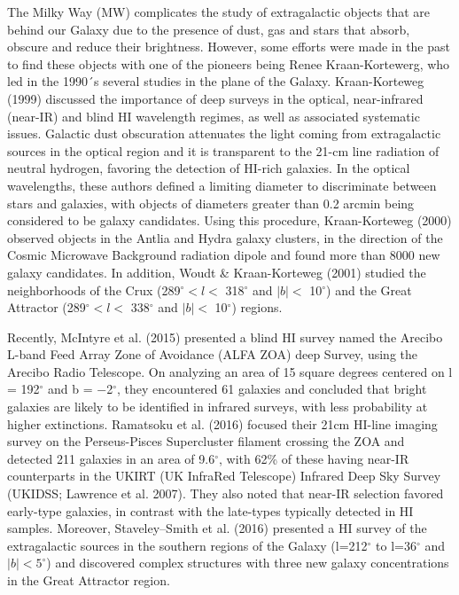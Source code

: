 \documentclass[preprint2]{aastex}
\begin{document}
The  Milky Way (MW) complicates the study of extragalactic 
objects that are 
behind our Galaxy due to the presence of dust, gas and stars that absorb,
obscure and 
reduce their brightness.
However, some efforts were made in the past to find these objects with
one of the pioneers being Renee Kraan-Kortewerg, who led in the 
1990´s several studies in the plane of the Galaxy.  Kraan-Korteweg (1999)
discussed the importance of deep surveys in the optical, near-infrared
(near-IR) and blind HI wavelength regimes, as well as associated systematic
issues.
Galactic dust obscuration attenuates the light coming from 
extragalactic sources in the optical region 
  and  it is transparent to the 21-cm line radiation of neutral hydrogen, favoring the detection
  of HI-rich galaxies.
In the optical wavelengths, these authors defined a limiting diameter to discriminate
between stars and galaxies, with objects of diameters greater than 
0.2 arcmin being considered to be galaxy candidates.  
Using this procedure, Kraan-Korteweg (2000) observed objects in the Antlia 
and Hydra galaxy clusters, in the direction of the Cosmic Microwave 
Background radiation dipole and found more than 8000 new galaxy candidates.
In addition, Woudt \& Kraan-Korteweg (2001) studied the 
neighborhoods of the Crux (289$^{\circ} < l < $ 318$^{\circ}$ and 
$|b| < $ 10$^{\circ}$)
and the Great Attractor (289$^{\circ} < l <$ 338$^{\circ}$ and 
$|b| < $ 10$^{\circ}$) regions.  

 Recently, McIntyre et al. (2015) presented a blind HI survey named the Arecibo 
L-band Feed 
Array Zone of Avoidance (ALFA ZOA) deep Survey, using the Arecibo Radio 
Telescope.  On analyzing an area of 15 square degrees centered on 
l = 192$^{\circ}$ and b = −2$^{\circ}$, they encountered 61 galaxies  and
  concluded that bright galaxies are likely to be identified
in  infrared surveys,  with less probability at higher extinctions.  
Ramatsoku et al. (2016) focused their 
21cm HI-line imaging survey on the 
Perseus-Pisces 
Supercluster filament crossing the ZOA and detected 211 galaxies in an
area of 9.6$^{\circ}$, with 62\% of these having near-IR counterparts in the
 UKIRT (UK InfraRed Telescope) Infrared
 Deep Sky Survey (UKIDSS; Lawrence et al. 2007).  They also noted that near-IR
 selection favored
early-type galaxies, in contrast with the late-types typically detected in HI 
samples. Moreover, Staveley--Smith et al. 
(2016) presented a HI survey of the 
extragalactic sources in the
southern regions of the Galaxy (l=212$^{\circ}$ to l=36$^{\circ}$ 
and $|b|<5^{\circ}$) and discovered complex 
structures  with three new galaxy concentrations in the Great Attractor region.
\end{document}
